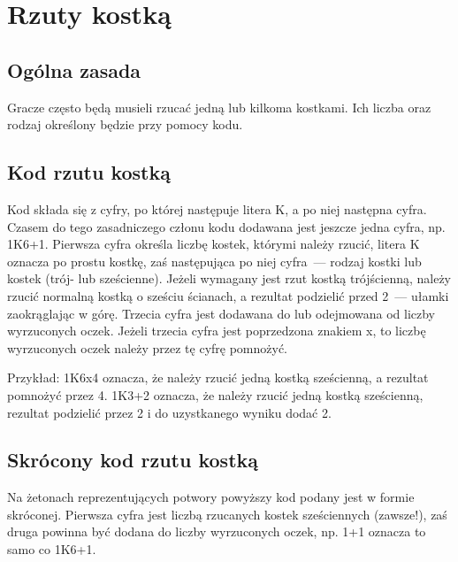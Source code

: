 \section{Rzuty kostką}
\subsection{Ogólna zasada}
Gracze często będą musieli rzucać jedną lub kilkoma kostkami.
Ich liczba oraz rodzaj określony będzie przy pomocy kodu.

\subsection{Kod rzutu kostką}
Kod składa się z cyfry, po której następuje litera K, a po niej następna cyfra.
Czasem do tego zasadniczego członu kodu dodawana jest jeszcze jedna cyfra, np. 1K6+1.
Pierwsza cyfra określa liczbę kostek, którymi należy rzucić, litera K oznacza po prostu kostkę, zaś następująca po niej cyfra~--- rodzaj kostki lub kostek (trój- lub sześcienne).
Jeżeli wymagany jest rzut kostką trójścienną, należy rzucić normalną kostką o sześciu ścianach, a rezultat podzielić przed 2~--- ułamki zaokrąglając w górę.
Trzecia cyfra jest dodawana do lub odejmowana od liczby wyrzuconych oczek.
Jeżeli trzecia cyfra jest poprzedzona znakiem x, to liczbę wyrzuconych oczek należy przez tę cyfrę pomnożyć.

Przykład: 1K6x4 oznacza, że należy rzucić jedną kostką sześcienną, a rezultat pomnożyć przez 4.
1K3+2 oznacza, że należy rzucić jedną kostką sześcienną, rezultat podzielić przez 2 i do uzystkanego wyniku dodać 2.

\subsection{Skrócony kod rzutu kostką}
Na żetonach reprezentujących potwory powyższy kod podany jest w formie skróconej.
Pierwsza cyfra jest liczbą rzucanych kostek sześciennych (zawsze!), zaś druga powinna być dodana do liczby wyrzuconych oczek, np. 1+1 oznacza to samo co 1K6+1.

